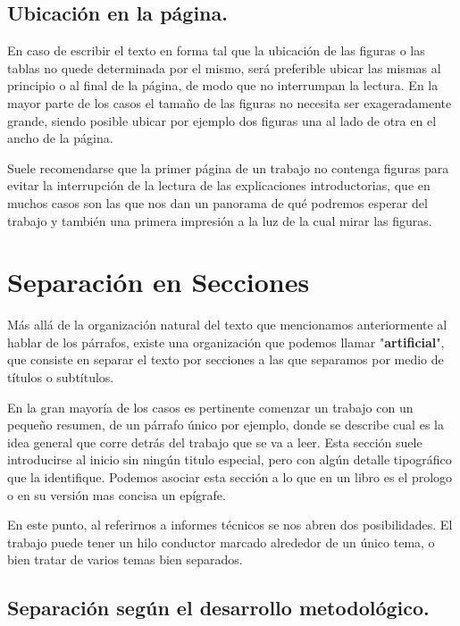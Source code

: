 \documentclass[11pt]{article}
\begin{document}
\subsection{Ubicación en la página.}
\label{sec-3-4}

En caso de escribir el texto en forma tal que la ubicación de las figuras o las tablas no quede determinada por el mismo,
será preferible ubicar las mismas al principio o al final de la página, de modo que no interrumpan la lectura. 
En la mayor parte de los casos el tamaño de las figuras no necesita ser exageradamente grande, siendo posible ubicar
por ejemplo dos figuras una al lado de otra en el ancho de la página.

Suele recomendarse que la primer página de un trabajo no contenga figuras para evitar la interrupción de la 
lectura de las explicaciones introductorias, que en muchos casos son las que nos dan un panorama de qué podremos
esperar del trabajo y también una primera impresión a la luz de la cual mirar las figuras.

\section{Separación en Secciones}
\label{sec-4}

Más allá de la organización natural del texto que mencionamos anteriormente al hablar de los párrafos,
existe una organización que podemos llamar "\textbf{artificial}", que consiste en separar el texto por secciones a
las que separamos por medio de títulos o subtítulos.

En la gran mayoría de los casos es pertinente comenzar un trabajo con un pequeño resumen, de un párrafo único
por ejemplo, donde se describe cual es la idea general que corre detrás del trabajo que se va a leer. Esta sección
suele introducirse al inicio sin ningún titulo especial, pero con algún detalle tipográfico que la identifique.
Podemos asociar esta sección a lo que en un libro es el prologo o en su versión mas concisa un epígrafe.

En este punto, al referirnos a informes técnicos se nos abren dos posibilidades. El trabajo puede tener un hilo
conductor marcado alrededor de un único tema, o bien tratar de varios temas bien separados.

\subsection{Separación según el desarrollo metodológico.}
\label{sec-4-1}
\end{document}
